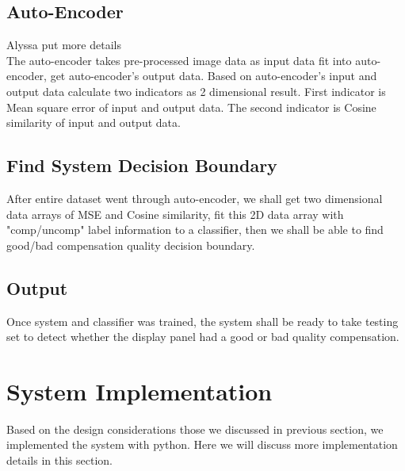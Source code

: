 \documentclass[runningheads]{llncs}
\begin{document}
\subsection{Auto-Encoder}
Alyssa put more details\\
The auto-encoder takes pre-processed image data as input data fit into auto-encoder, get auto-encoder's output data. Based on auto-encoder's input and output data calculate two indicators as 2 dimensional result. 
First indicator is Mean square error of input and output data. The second indicator is Cosine similarity of input and output data. \\
\subsection{Find System Decision Boundary}
After entire dataset went through auto-encoder, we shall get two dimensional data arrays of MSE and Cosine similarity, fit this 2D data array with "comp/uncomp" label information to a classifier, then we shall be able to find good/bad compensation quality decision boundary. 
\subsection{Output}
Once system and classifier was trained, the system shall be ready to take testing set to detect whether the display panel had a good or bad quality compensation.

\section{System Implementation}
Based on the design considerations those we discussed in previous section, we implemented the system with python. Here we will discuss more implementation details in this section. 
\end{document}
